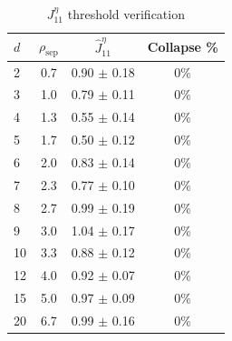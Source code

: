 \begin{table}[h]
\centering
\caption{$J_{11}^\eta$ threshold verification}
\label{tab:e8_jacobian}
\begin{tabular}{lccc}
\toprule
$d$ & $\rho_{\mathrm{sep}}$ & $\hat{J}_{11}^\eta$ & Collapse \% \\
\midrule
2 & 0.7 & 0.90 $\pm$ 0.18 & 0\% \\
3 & 1.0 & 0.79 $\pm$ 0.11 & 0\% \\
4 & 1.3 & 0.55 $\pm$ 0.14 & 0\% \\
5 & 1.7 & 0.50 $\pm$ 0.12 & 0\% \\
6 & 2.0 & 0.83 $\pm$ 0.14 & 0\% \\
7 & 2.3 & 0.77 $\pm$ 0.10 & 0\% \\
8 & 2.7 & 0.99 $\pm$ 0.19 & 0\% \\
9 & 3.0 & 1.04 $\pm$ 0.17 & 0\% \\
10 & 3.3 & 0.88 $\pm$ 0.12 & 0\% \\
12 & 4.0 & 0.92 $\pm$ 0.07 & 0\% \\
15 & 5.0 & 0.97 $\pm$ 0.09 & 0\% \\
20 & 6.7 & 0.99 $\pm$ 0.16 & 0\% \\
\bottomrule
\end{tabular}
\end{table}
